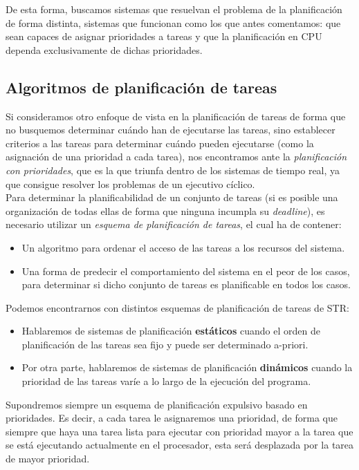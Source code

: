 De esta forma, buscamos sistemas que resuelvan el problema de la planificación de forma distinta, sistemas que funcionan como los que antes comentamos: que sean capaces de asignar prioridades a tareas y que la planificación en CPU dependa exclusivamente de dichas prioridades.

\subsection{Algoritmos de planificación de tareas}
Si consideramos otro enfoque de vista en la planificación de tareas de forma que no busquemos determinar cuándo han de ejecutarse las tareas, sino establecer criterios a las tareas para determinar cuándo pueden ejecutarse (como la asignación de una prioridad a cada tarea), nos encontramos ante la \textit{planificación con prioridades}, que es la que triunfa dentro de los sistemas de tiempo real, ya que consigue resolver los problemas de un ejecutivo cíclico.\\

Para determinar la planificabilidad de un conjunto de tareas (si es posible una organización de todas ellas de forma que ninguna incumpla su \textit{deadline}), es necesario utilizar un \textit{esquema de planificación de tareas}, el cual ha de contener:
\begin{itemize}
    \item Un algoritmo para ordenar el acceso de las tareas a los recursos del sistema.
    \item Una forma de predecir el comportamiento del sistema en el peor de los casos, para determinar si dicho conjunto de tareas es planificable en todos los casos.
\end{itemize}
Podemos encontrarnos con distintos esquemas de planificación de tareas de STR\@:
\begin{itemize}
    \item Hablaremos de sistemas de planificación \textbf{estáticos} cuando el orden de planificación de las tareas sea fijo y puede ser determinado a-priori.
    \item Por otra parte, hablaremos de sistemas de planificación \textbf{dinámicos} cuando la prioridad de las tareas varíe a lo largo de la ejecución del programa.
\end{itemize}
Supondremos siempre un esquema de planificación expulsivo basado en prioridades. Es decir, a cada tarea le asignaremos una prioridad, de forma que siempre que haya una tarea lista para ejecutar con prioridad mayor a la tarea que se está ejecutando actualmente en el procesador, esta será desplazada por la tarea de mayor prioridad.

